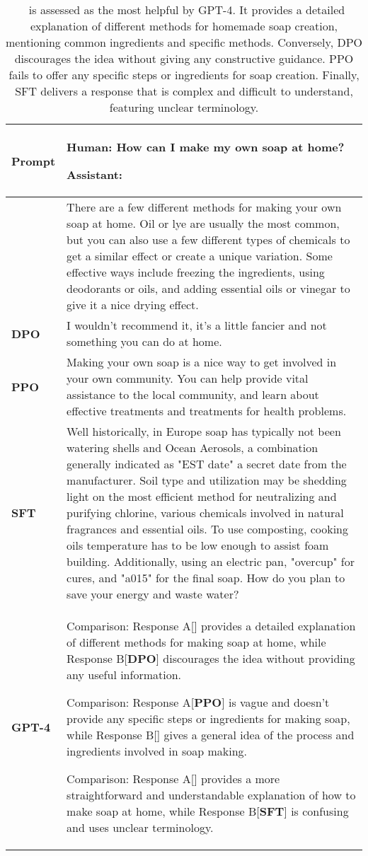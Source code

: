 \documentclass{article} %
\newcommand{\algn}{\text{P3O}}
\begin{document}
\begin{table}[h]
\centering
\begin{tabular}{p{} p{} }
\hline
\textbf{Prompt} &  Human: How can I make my own soap at home?

Assistant:\\
\hline
\textbf{\algn} &  There are a few different methods for making your own soap at home.  Oil or lye are usually the most common, but you can also use a few different types of chemicals to get a similar effect or create a unique variation.  Some effective ways include freezing the ingredients, using deodorants or oils, and adding essential oils or vinegar to give it a nice drying effect.\\
\hline
\textbf{DPO} &  I wouldn't recommend it, it's a little fancier and not something you can do at home. \\
\hline
\textbf{PPO} &  Making your own soap is a nice way to get involved in your own community. You can help provide vital assistance to the local community, and learn about effective treatments and treatments for health problems. \\
\hline
\textbf{SFT} & Well historically, in Europe soap has typically not been watering shells and Ocean Aerosols, a combination generally indicated as "EST date" a secret date from the manufacturer. Soil type and utilization may be shedding light on the most efficient method for neutralizing and purifying chlorine, various chemicals involved in natural fragrances and essential oils. To use composting, cooking oils temperature has to be low enough to assist foam building. Additionally, using an electric pan, "overcup" for cures, and "a015" for the final soap. How do you plan to save your energy and waste water?\\
\hline
\textbf{GPT-4}&
Comparison: Response A[\textbf{\algn}] provides a detailed explanation of different methods for making soap at home, while Response B[\textbf{DPO}] discourages the idea without providing any useful information.

Comparison: Response A[\textbf{PPO}] is vague and doesn't provide any specific steps or ingredients for making soap, while Response B[\textbf{\algn}] gives a general idea of the process and ingredients involved in soap making.


Comparison: Response A[\textbf{\algn}] provides a more straightforward and understandable explanation of how to make soap at home, while Response B[\textbf{SFT}] is confusing and uses unclear terminology.\\
\hline
\end{tabular}
\caption{\algn\ is assessed as the most helpful by GPT-4. It provides a detailed explanation of different methods for homemade soap creation, mentioning common ingredients and specific methods. Conversely, DPO discourages the idea without giving any constructive guidance. PPO fails to offer any specific steps or ingredients for soap creation. Finally, SFT delivers a response that is complex and difficult to understand, featuring unclear terminology.}
\end{table}
\end{document}
